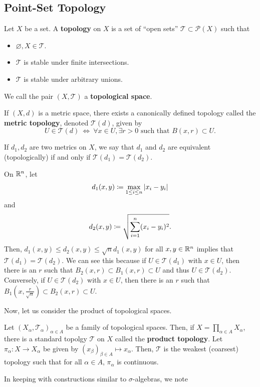 \documentclass[11pt,leqno,oneside]{amsbook}
\numberwithin{thm}{section}
\renewcommand{\P}{\mathcal{P}} %
\newcommand{\Top}{\mathcal{T}} %
\newcommand{\s}{$\sigma$-} %
\renewcommand{\de}{\textbf} %
\begin{document}
\subsection{Point-Set Topology}
\begin{defn}
  Let $X$ be a set. A \de{topology} on $X$ is a set of ``open sets''
  $\Top \subset \P(X)$ such that
  \begin{itemize}
  \item $\varnothing, X \in \Top$.
  \item $\Top$ is stable under finite intersections.
  \item $\Top$ is stable under arbitrary unions.
  \end{itemize}
  We call the pair $(X,\Top)$ a \de{topological space}.
\end{defn}
\begin{defn}
  If $(X,d)$ is a metric space, there exists a canonically defined
  topology called the \de{metric topology}, denoted $\Top(d)$, given
  by \[
    U \in \Top(d) \ \iff \ \forall x \in U, \exists r > 0 \text{ such
      that } B(x,r) \subset U.
  \]
\end{defn}
If $d_1,d_2$ are two metrics on $X$, we say that $d_1$ and $d_2$ are
equivalent (topologically) if and only if $\Top(d_1) = \Top(d_2)$.
\begin{example}
  On ${\mathbb R}^n$, let \[
    d_1(x,y) \coloneqq \max_{1 \leq i \leq n} \left| x_i - y_i \right|
  \]
  and \[
    d_2(x,y) \coloneqq \sqrt{\sum_{i=1}^n (x_i-y_i)^2}.
  \]
  Then, $d_1(x,y) \leq d_2(x,y) \leq \sqrt{n} d_1(x,y)$ for all $x,y
  \in {\mathbb R}^n$ implies that $\Top(d_1) = \Top(d_2)$. We can see this
  because if $U \in \Top(d_1)$ with $x \in U$, then there is an $r$
  such that $B_2(x,r) \subset B_1(x,r) \subset U$ and thus $U \in
  \Top(d_2)$. Conversely, if $U \in \Top(d_2)$ with $x \in U$, then
  there is an $r$ such that $B_1(x,\frac{r}{\sqrt{n}}) \subset
  B_2(x,r) \subset U$.
\end{example}
Now, let us consider the product of topological spaces.
\begin{defn}
  Let $(X_\alpha, \Top_\alpha)_{\alpha \in A}$ be a family of
  topological spaces. Then, if $X = \prod_{\alpha \in A} X_\alpha$,
  there is a standard topolgy $\Top$ on $X$ called the \de{product
    topology}. Let $\pi_\alpha\colon  X \to X_\alpha$ be given by
  $(x_\beta)_{\beta \in A} \mapsto x_\alpha$. Then, $\Top$ is the
  weakest (coarsest) topology such that for all $\alpha \in A$,
  $\pi_\alpha$ is continuous.
\end{defn}
In keeping with constructions similar to \s algebras, we note
\end{document}
